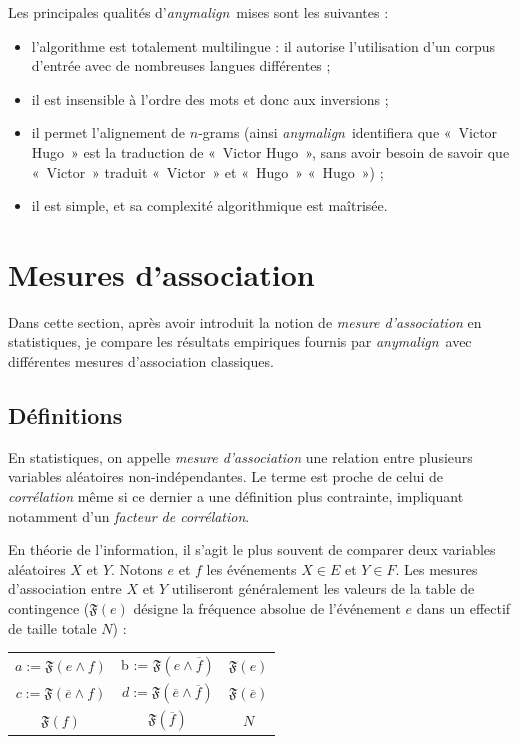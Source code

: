 \documentclass[a4paper,10pt]{article}
\newcommand{\anym}{\emph{anymalign}}
\newcommand{\guill}[1]{«~#1~»}
\begin{document}
Les principales qualités d'\anym~mises sont les suivantes :
\begin{itemize}
\item l'algorithme est totalement  multilingue : il autorise l'utilisation d'un corpus d'entrée avec de nombreuses langues différentes ;
\item il est insensible à l'ordre des mots et donc aux inversions ;
\item il permet l'alignement de $n$-grams (ainsi \anym~identifiera que \guill{Victor Hugo} est la traduction de \guill{Victor Hugo}, sans avoir besoin de savoir que \guill{Victor} traduit \guill{Victor} et \guill{Hugo} \guill{Hugo}) ;
\item il est simple, et sa complexité algorithmique est maîtrisée.
\end{itemize}



\section{Mesures d'association}

Dans cette section, après avoir introduit la notion de \emph{mesure d'association} en statistiques, je compare les résultats empiriques fournis par \anym~avec différentes mesures d'association classiques.

\subsection{Définitions}

En statistiques, on appelle \emph{mesure d'association} une relation entre plusieurs variables aléatoires non-indépendantes. Le terme est proche de celui de \emph{corrélation} même si ce dernier a une définition plus contrainte, impliquant notamment d'un \emph{facteur de corrélation}.

En théorie de l'information, il s'agit le plus souvent de comparer deux variables aléatoires $X$ et $Y$. Notons $e$ et $f$ les événements $X \in E$ et $Y \in F$. Les mesures d'association entre $X$ et $Y$ utiliseront généralement les valeurs de la table de contingence ($\mathfrak{F}(e)$ désigne la fréquence absolue de l'événement $e$ dans un effectif de taille totale $N$) :

\begin{tabular}{|cc|c|}
\hline
$a := \mathfrak{F}(e\wedge f)$ & b := $\mathfrak{F}(e\wedge\overline{f})$ & $\mathfrak{F}(e)$ \\
$c := \mathfrak{F}(\overline{e}\wedge f)$ & $d := \mathfrak{F}(\overline{e}\wedge\overline{f})$ & $\mathfrak{F}(\overline{e})$ \\
\hline
$\mathfrak{F}(f)$ & $\mathfrak{F}(\overline{f})$ & $N$ \\
\hline
\end{tabular}
\end{document}
